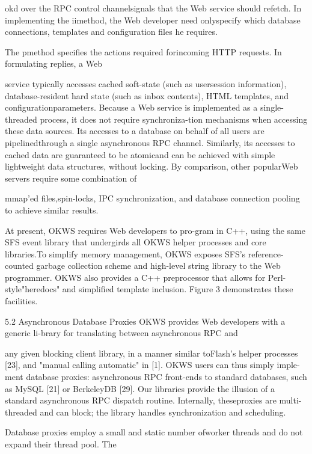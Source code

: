 okd over the RPC control channelsignals that the Web service should refetch. In implementing the i\Gamma i\Delta  method, the Web developer need onlyspecify which database connections, templates and configuration files he requires.

The p\Theta \Lambda \Xi \Pi \Sigma \Sigma  method specifies the actions required forincoming HTTP requests. In formulating replies, a Web

service typically accesses cached soft-state (such as usersession information), database-resident hard state (such
as inbox contents), HTML templates, and configurationparameters. Because a Web service is implemented as a
single-threaded process, it does not require synchroniza-tion mechanisms when accessing these data sources. Its
accesses to a database on behalf of all users are pipelinedthrough a single asynchronous RPC channel. Similarly,
its accesses to cached data are guaranteed to be atomicand can be achieved with simple lightweight data structures, without locking. By comparison, other popularWeb servers require some combination of

mmap'ed files,spin-locks, IPC synchronization, and database connection pooling to achieve similar results.

At present, OKWS requires Web developers to pro-gram in C++, using the same SFS event library that undergirds all OKWS helper processes and core libraries.To simplify memory management, OKWS exposes SFS's
reference-counted garbage collection scheme and high-level string library to the Web programmer. OKWS also
provides a C++ preprocessor that allows for Perl-style"heredocs" and simplified template inclusion. Figure 3
demonstrates these facilities.

5.2 Asynchronous Database Proxies
OKWS provides Web developers with a generic li-brary for translating between asynchronous RPC and

any given blocking client library, in a manner similar toFlash's helper processes [23], and "manual calling automatic" in [1]. OKWS users can thus simply imple-ment database proxies: asynchronous RPC front-ends
to standard databases, such as MySQL [21] or BerkeleyDB [29]. Our libraries provide the illusion of a standard
asynchronous RPC dispatch routine. Internally, theseproxies are multi-threaded and can block; the library handles synchronization and scheduling.

Database proxies employ a small and static number ofworker threads and do not expand their thread pool. The

